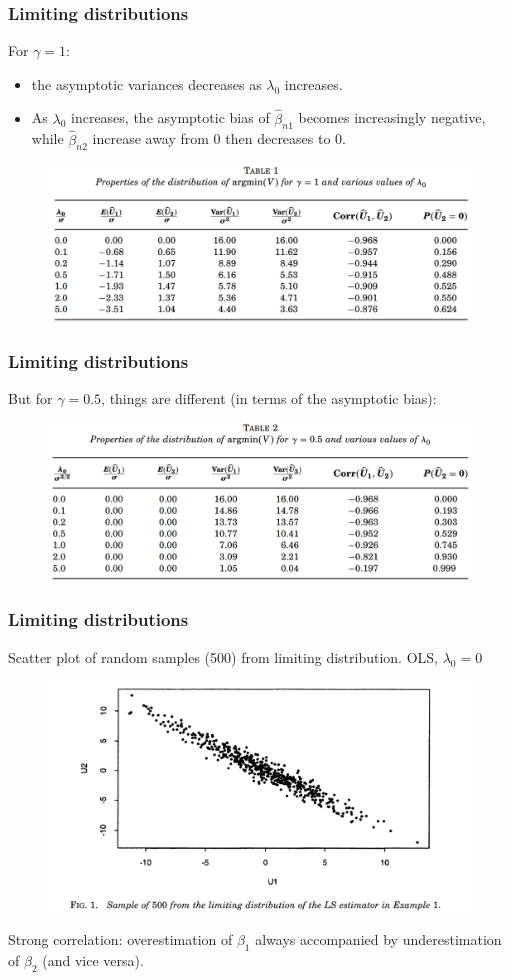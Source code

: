 \documentclass{beamer}
\begin{document}
	\begin{frame}
		\frametitle{Limiting distributions}
		For $\gamma = 1$:
		\begin{itemize}
			\item 
			the asymptotic variances decreases as $\lambda_0$ increases.
			\item
			As $\lambda_0$ increases, the asymptotic bias of $\hat{\beta}_{n1}$ becomes increasingly negative, while $\hat{\beta}_{n2}$ increase away from 0 then decreases to 0.
		\end{itemize}
		\begin{figure}
			\includegraphics[width=1\linewidth]{image006.png}
		\end{figure}
	\end{frame}
	
	\begin{frame}
		\frametitle{Limiting distributions}
		But for $\gamma = 0.5$, things are different (in terms of the asymptotic bias):
		\begin{figure}
			\includegraphics[width=1\linewidth]{image007.png}
		\end{figure}
	\end{frame}
	
	\begin{frame}
		\frametitle{Limiting distributions}
		Scatter plot of random samples (500) from limiting distribution. OLS, $\lambda_0 = 0$
		\begin{figure}
			\includegraphics[width=.8\linewidth]{image008.png}
		\end{figure}
		Strong correlation: overestimation of $\beta_1$ always accompanied by underestimation of $\beta_2$ (and vice versa).
	\end{frame}
	
\end{document}
